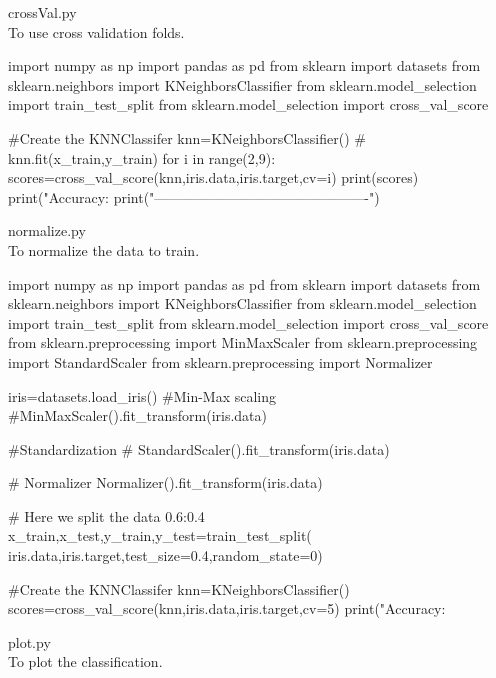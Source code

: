 \documentclass[a4pper,11pt,onecolumn]{article}
\begin{document}
crossVal.py\\

To use cross validation folds.

\begin{python}
import numpy as np
import pandas as pd
from sklearn import datasets
from sklearn.neighbors import KNeighborsClassifier
from sklearn.model_selection import train_test_split
from sklearn.model_selection import cross_val_score

#Create the KNNClassifer
knn=KNeighborsClassifier()
# knn.fit(x_train,y_train)
for i in range(2,9):
scores=cross_val_score(knn,iris.data,iris.target,cv=i)
print(scores)
print("Accuracy:%
print("----------------------------------------------")
\end{python}


normalize.py\\

To normalize the data to train.

\begin{python}
import numpy as np
import pandas as pd
from sklearn import datasets
from sklearn.neighbors import KNeighborsClassifier
from sklearn.model_selection import train_test_split
from sklearn.model_selection import cross_val_score
from sklearn.preprocessing import MinMaxScaler
from sklearn.preprocessing import StandardScaler
from sklearn.preprocessing import Normalizer

iris=datasets.load_iris()
#Min-Max scaling
#MinMaxScaler().fit_transform(iris.data)

#Standardization
# StandardScaler().fit_transform(iris.data)

# Normalizer
Normalizer().fit_transform(iris.data)

# Here we split the data 0.6:0.4
x_train,x_test,y_train,y_test=train_test_split(
iris.data,iris.target,test_size=0.4,random_state=0)

#Create the KNNClassifer
knn=KNeighborsClassifier()
scores=cross_val_score(knn,iris.data,iris.target,cv=5)
print("Accuracy:%
\end{python}

plot.py\\

To plot the classification.
\end{document}
